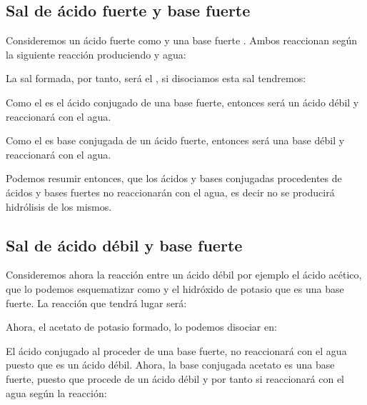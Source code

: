 \subsection{Sal de ácido fuerte y base fuerte}\label{subsec:sal-de-acido-fuerte-y-base-fuerte}

Consideremos un ácido fuerte como  y una base fuerte .
Ambos reaccionan según la siguiente reacción produciendo  y agua:
\begin{centeredequation}
\end{centeredequation}

La sal formada, por tanto, será el , si disociamos esta sal tendremos:
\begin{centeredequation}
\end{centeredequation}


Como el  es el ácido conjugado de una base fuerte, entonces será un ácido débil y  reaccionará con el agua.

Como el  es base conjugada de un ácido fuerte, entonces será una base débil y  reaccionará con el agua.

Podemos resumir entonces, que los ácidos y bases conjugadas procedentes de ácidos y bases fuertes no reaccionarán con el agua, es decir no se producirá hidrólisis de los mismos.


\subsection{Sal de ácido débil y base fuerte}\label{subsec:sal-de-acido-debil-y-base-fuerte}

Consideremos ahora la reacción entre un ácido débil por ejemplo el ácido acético, que lo podemos esquematizar como  y el hidróxido de potasio  que es una base fuerte.
La reacción que tendrá lugar será:
\begin{centeredequation}
\end{centeredequation}


Ahora, el acetato de potasio formado, lo podemos disociar en:
\begin{centeredequation}
\end{centeredequation}


El ácido conjugado  al proceder de una base fuerte, no reaccionará con el agua puesto que es un ácido débil.
Ahora, la base conjugada acetato  es una base fuerte, puesto que procede de un ácido débil y por tanto si reaccionará con el agua según la reacción:
\begin{centeredequation}
\end{centeredequation}


